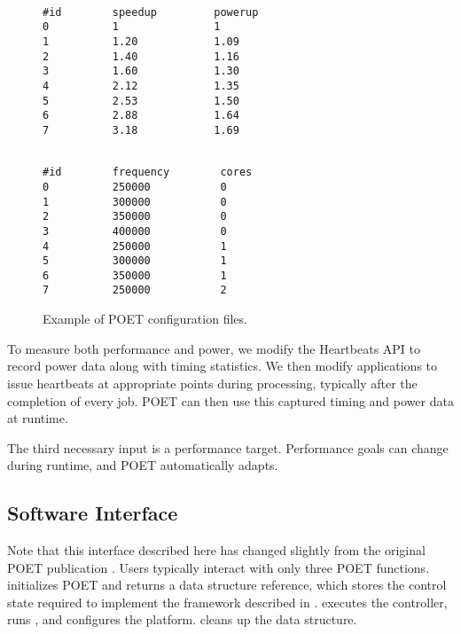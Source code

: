\begin{figure}[t]
\centering
\begin{minipage}{.45\columnwidth}
\lstset{
  belowskip=0pt,
  aboveskip=0pt,
}
\begin{lstlisting}[frame=tlr,%
  caption={System-agnostic.},%
  label={lst:control_config_example}]%

#id        speedup         powerup
0          1               1
1          1.20            1.09
2          1.40            1.16
3          1.60            1.30
4          2.12            1.35
5          2.53            1.50
6          2.88            1.64
7          3.18            1.69
\end{lstlisting}
\end{minipage}
\hspace*{0.4cm}
\begin{minipage}{.45\columnwidth}
\lstset{
  belowskip=0pt,
  aboveskip=0pt,
}
\begin{lstlisting}[frame=tlr,%
  caption={System-specific.},%
  label={lst:cpu_config_example}]%

#id        frequency        cores
0          250000           0
1          300000           0
2          350000           0
3          400000           0
4          250000           1
5          300000           1
6          350000           1
7          250000           2
\end{lstlisting}
\end{minipage}
\caption{Example of POET configuration files.}
\label{fig:config-examples}
\end{figure}

To measure both performance and power, we modify the Heartbeats API \cite{PTRADE} to record power data along with timing statistics.
We then modify applications to issue heartbeats at appropriate points during processing, typically after the completion of every job.
POET can then use this captured timing and power data at runtime.

The third necessary input is a performance target.
Performance goals can change during runtime, and POET automatically adapts.


\subsection{Software Interface}
\label{sec:poet-interface}

Note that this interface described here has changed slightly from the original POET publication \cite{POET}.
Users typically interact with only three POET functions.
 initializes POET and returns a  data structure reference, which stores the control state required to implement the framework described in .
 executes the controller, runs , and configures the platform.
 cleans up the  data structure.

